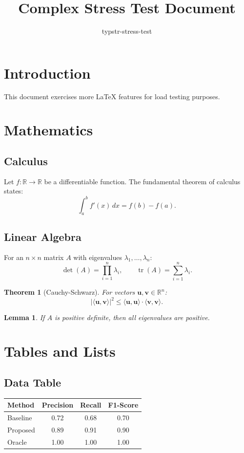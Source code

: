 \documentclass[12pt]{article}
\title{Complex Stress Test Document}
\author{typstr-stress-test}
\date{}
\newtheorem{theorem}{Theorem}
\newtheorem{lemma}{Lemma}
\begin{document}
\maketitle
\tableofcontents

\section{Introduction}
This document exercises more \LaTeX{} features for load testing purposes.

\section{Mathematics}
\subsection{Calculus}
Let $f : \mathbb{R} \to \mathbb{R}$ be a differentiable function. The fundamental
theorem of calculus states:
\begin{equation}
  \int_a^b f'(x)\,dx = f(b) - f(a).
\end{equation}

\subsection{Linear Algebra}
For an $n \times n$ matrix $A$ with eigenvalues $\lambda_1, \dots, \lambda_n$:
\begin{equation}
  \det(A) = \prod_{i=1}^{n} \lambda_i, \qquad \operatorname{tr}(A) = \sum_{i=1}^{n} \lambda_i.
\end{equation}

\begin{theorem}[Cauchy-Schwarz]
For vectors $\mathbf{u}, \mathbf{v} \in \mathbb{R}^n$:
\[
  |\langle \mathbf{u}, \mathbf{v} \rangle|^2 \le \langle \mathbf{u}, \mathbf{u} \rangle \cdot \langle \mathbf{v}, \mathbf{v} \rangle.
\]
\end{theorem}

\begin{lemma}
If $A$ is positive definite, then all eigenvalues are positive.
\end{lemma}

\section{Tables and Lists}

\subsection{Data Table}
\begin{center}
\begin{tabular}{lccc}
  \hline
  Method    & Precision & Recall & F1-Score \\
  \hline
  Baseline  & 0.72      & 0.68   & 0.70     \\
  Proposed  & 0.89      & 0.91   & 0.90     \\
  Oracle    & 1.00      & 1.00   & 1.00     \\
  \hline
\end{tabular}
\end{center}
\end{document}

